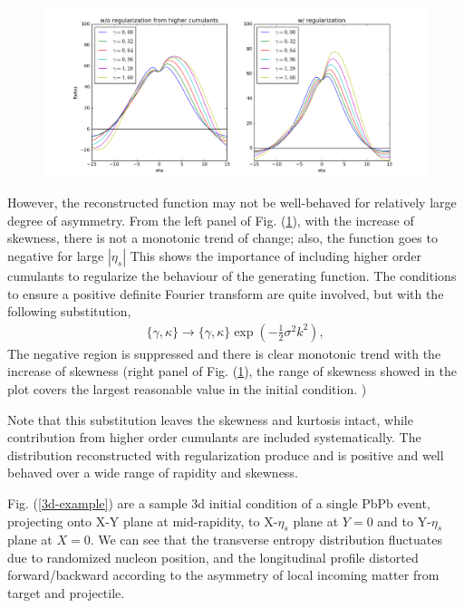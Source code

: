 \documentclass[aps,prl,twocolumn,groupedaddress]{revtex4-1}
\begin{document}
	\begin{figure}\label{regulation}
	\includegraphics[width=\columnwidth]{pics/regulate.png}
	\end{figure}
 
	However, the reconstructed function may not be well-behaved for relatively large degree of asymmetry. 
	From the left panel of Fig. (\ref{regulation}), with the increase of skewness, there is not a monotonic trend of change; also, the function goes to negative for large $|\eta_s|$
	This shows the importance of including higher order cumulants to regularize the behaviour of the generating function. 
	The conditions to ensure a positive definite Fourier transform are quite involved, but with the following substitution,
	\begin{eqnarray}
		\{\gamma, \kappa\} \rightarrow \{\gamma, \kappa\} \exp\left(-\frac{1}{2}\sigma^2k^2\right),
	\end{eqnarray}
	The negative region is suppressed and there is clear monotonic trend with the increase of skewness (right panel of Fig. (\ref{regulation}), the range of skewness showed in the plot covers the largest reasonable value in the initial condition. )
		
	Note that this substitution leaves the skewness and kurtosis intact, while contribution from higher order cumulants are included systematically.
	The distribution reconstructed with regularization produce and is positive and well behaved over a wide range of rapidity and skewness.
	
	Fig. (\ref{3d-example}) are a sample 3d initial condition of a single PbPb event, projecting onto X-Y plane at mid-rapidity, to X-$\eta_s$ plane at $Y = 0$ and to Y-$\eta_s$ plane at $X = 0$. We can see that the transverse entropy distribution fluctuates due to randomized nucleon position, and the longitudinal profile distorted forward/backward according to the asymmetry of local incoming matter from target and projectile. 
	
\end{document}
